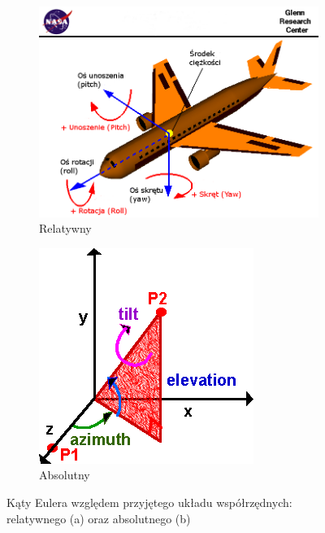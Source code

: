 \begin{savenotes}
	\begin{figure}[!htb]
		\captionsetup{singlelinecheck=off}
		\centering
		\begin{subfigure}[b]{0.63\textwidth}
			\centering
			\includegraphics[width=\textwidth]{images/nasaAircraft.png}	
			\caption[Kąty Eulera w relatywnym układzie współrzędnych]{Relatywny }
			\label{fig:appx:rot:eulerRel}
		\end{subfigure}
		\hfill																																						
		\begin{subfigure}[b]{0.35\textwidth}
			\centering
			\includegraphics[width=\textwidth]{images/eulerAbsolute.png}		
			\caption[Kąty Eulera w absolutnym układzie współrzędnych]{Absolutny }
			\label{fig:appx:rot:eulerAbs}
		\end{subfigure}																																			
		\caption{Kąty Eulera względem przyjętego układu współrzędnych: relatywnego (a) oraz absolutnego (b)}
		\label{fig:appx:rot:euler}
	\end{figure}
\end{savenotes}
